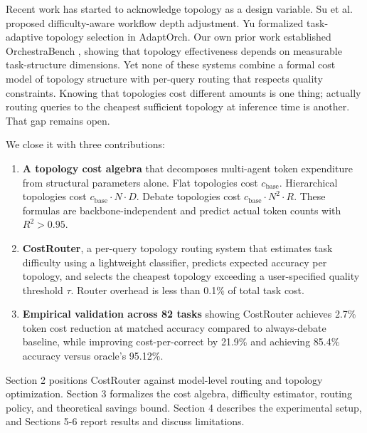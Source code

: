 Recent work has started to acknowledge topology as a design variable. Su et al.~\cite{su_2025} proposed difficulty-aware workflow depth adjustment. Yu \cite{yu_2026} formalized task-adaptive topology selection in AdaptOrch. Our own prior work established OrchestraBench \cite{orchestrabench_2026}, showing that topology effectiveness depends on measurable task-structure dimensions. Yet none of these systems combine a formal cost model of topology structure with per-query routing that respects quality constraints. Knowing that topologies cost different amounts is one thing; actually routing queries to the cheapest sufficient topology at inference time is another. That gap remains open.

We close it with three contributions:

\begin{enumerate}
\def\labelenumi{\arabic{enumi}.}
\item
  \textbf{A topology cost algebra} that decomposes multi-agent token expenditure from structural parameters alone. Flat topologies cost $c_{\text{base}}$. Hierarchical topologies cost $c_{\text{base}} \cdot N \cdot D$. Debate topologies cost $c_{\text{base}} \cdot N^2 \cdot R$. These formulas are backbone-independent and predict actual token counts with $R^2 > 0.95$.
\item
  \textbf{CostRouter}, a per-query topology routing system that estimates task difficulty using a lightweight classifier, predicts expected accuracy per topology, and selects the cheapest topology exceeding a user-specified quality threshold $\tau$. Router overhead is less than 0.1\% of total task cost.
\item
  \textbf{Empirical validation across 82 tasks} showing CostRouter achieves 2.7\% token cost reduction at matched accuracy compared to always-debate baseline, while improving cost-per-correct by 21.9\% and achieving 85.4\% accuracy versus oracle's 95.12\%.
\end{enumerate}

Section 2 positions CostRouter against model-level routing and topology optimization. Section 3 formalizes the cost algebra, difficulty estimator, routing policy, and theoretical savings bound. Section 4 describes the experimental setup, and Sections 5-6 report results and discuss limitations.
